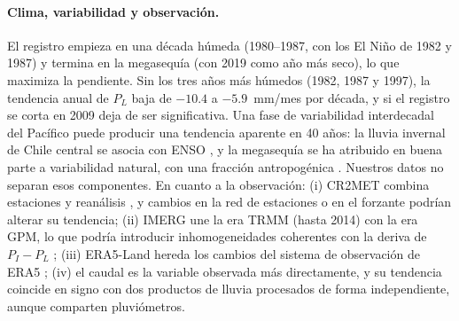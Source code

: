 \documentclass[11pt,a4paper]{article}
\newcommand{\PL}{P_L}
\newcommand{\PI}{P_I}
\begin{document}
\paragraph{Clima, variabilidad y observación.} El registro empieza en una década húmeda (1980--1987, con los El Niño de 1982 y 1987) y termina en la megasequía (con 2019 como año más seco), lo que maximiza la pendiente. Sin los tres años más húmedos (1982, 1987 y 1997), la tendencia anual de $\PL$ baja de $-10.4$ a $-5.9$~mm/mes por década, y si el registro se corta en 2009 deja de ser significativa. Una fase de variabilidad interdecadal del Pacífico puede producir una tendencia aparente en 40 años: la lluvia invernal de Chile central se asocia con ENSO \citep{Montecinos2003}, y la megasequía se ha atribuido en buena parte a variabilidad natural, con una fracción antropogénica \citep{Boisier2016,Garreaud2020}. Nuestros datos no separan esos componentes. En cuanto a la observación: (i) CR2MET combina estaciones y reanálisis \citep{AlvarezGarreton2018}, y cambios en la red de estaciones o en el forzante podrían alterar su tendencia; (ii) IMERG une la era TRMM (hasta 2014) con la era GPM, lo que podría introducir inhomogeneidades coherentes con la deriva de $\PI-\PL$ \citep{Huffman2020}; (iii) ERA5-Land hereda los cambios del sistema de observación de ERA5 \citep{MunozSabater2021}; (iv) el caudal es la variable observada más directamente, y su tendencia coincide en signo con dos productos de lluvia procesados de forma independiente, aunque comparten pluviómetros.
\end{document}
